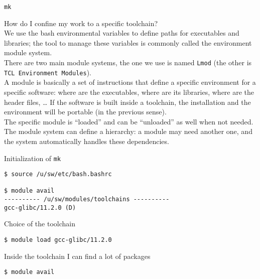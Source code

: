 \documentclass[10pt]{beamer}
\begin{document}
\begin{frame}{\texttt{mk}}

  How do I confine my work to a specific toolchain?\\[3mm]

  We use the bash environmental variables to define paths for executables and libraries; the tool to manage these variables is commonly called 
  the environment module system.\\[3mm]

  There are two main module systems, the one we use is named \texttt{Lmod} (the other is \texttt{TCL Environment Modules}).\\[3mm]

  A module is basically a set of instructions that define a specific environment for a specific software: where are the executables, where are its libraries, where are the header files, … 
  If the software is built inside a toolchain, the installation and the environment  will be portable (in the previous sense).\\[3mm]

  The specific module is “loaded” and can be “unloaded” as well when not needed.\\[3mm]

  The module system can define a hierarchy: a module may need another one, and the system automatically handles these dependencies.

\end{frame}

\begin{frame}[fragile]

  Initialization of \texttt{mk}

\begin{verbatim}
$ source /u/sw/etc/bash.bashrc

$ module avail
---------- /u/sw/modules/toolchains ----------
gcc-glibc/11.2.0 (D)
\end{verbatim}

Choice of the toolchain
\begin{verbatim}
$ module load gcc-glibc/11.2.0
\end{verbatim}

Inside the toolchain I can find a lot of packages
\begin{verbatim}
$ module avail
\end{verbatim}
\end{frame}
\end{document}
